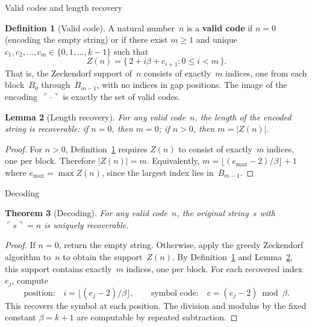 \documentclass[11pt]{amsart}
\makeatletter
\renewcommand{\subsection}{\@startsection{subsection}{2}%
  \z@{.5\linespacing\@plus.7\linespacing}{-.5em}%
  {\normalfont\bfseries}}
\theoremstyle{plain}
\newtheorem{theorem}{Theorem}[section]
\newtheorem{lemma}[theorem]{Lemma}
\theoremstyle{definition}
\newtheorem{definition}[theorem]{Definition}
\theoremstyle{remark}
\newcommand{\gc}[1]{\ulcorner #1 \urcorner}
\makeatother
\begin{document}
\subsection{Valid codes and length recovery}

\begin{definition}[Valid code]\label{def:valid}
A natural number~$n$ is a \textbf{valid code} if $n=0$ (encoding the empty string) or if there exist $m \ge 1$ and unique $c_1, c_2, \ldots, c_m \in \{0,1,\ldots,k-1\}$ such that
\[
Z(n) = \bigl\{\, 2 + i\beta + c_{i+1} : 0 \le i < m \,\bigr\}.
\]
That is, the Zeckendorf support of~$n$ consists of exactly~$m$ indices, one from each block~$B_0$ through~$B_{m-1}$, with no indices in gap positions. The image of the encoding~$\gc{\cdot}$ is exactly the set of valid codes.
\end{definition}

\begin{lemma}[Length recovery]\label{lem:length}
For any valid code~$n$, the length of the encoded string is recoverable: if $n=0$, then $m=0$; if $n > 0$, then $m = |Z(n)|$.
\end{lemma}

\begin{proof}
For $n > 0$, Definition~\ref{def:valid} requires $Z(n)$ to consist of exactly~$m$ indices, one per block. Therefore $|Z(n)|=m$. Equivalently, $m = \lfloor (e_{\max}-2)/\beta \rfloor + 1$ where $e_{\max} = \max Z(n)$, since the largest index lies in~$B_{m-1}$.
\end{proof}

\subsection{Decoding}

\begin{theorem}[Decoding]\label{thm:decode}
For any valid code~$n$, the original string~$s$ with $\gc{s}=n$ is uniquely recoverable.
\end{theorem}

\begin{proof}
If $n=0$, return the empty string. Otherwise, apply the greedy Zeckendorf algorithm to~$n$ to obtain the support~$Z(n)$. By Definition~\ref{def:valid} and Lemma~\ref{lem:length}, this support contains exactly~$m$ indices, one per block. For each recovered index~$e_j$, compute
\[
\text{position:}\quad i = \bigl\lfloor (e_j - 2)/\beta \bigr\rfloor, \qquad \text{symbol code:}\quad c = (e_j - 2) \bmod \beta.
\]
This recovers the symbol at each position. The division and modulus by the fixed constant $\beta = k+1$ are computable by repeated subtraction.
\end{proof}
\end{document}
